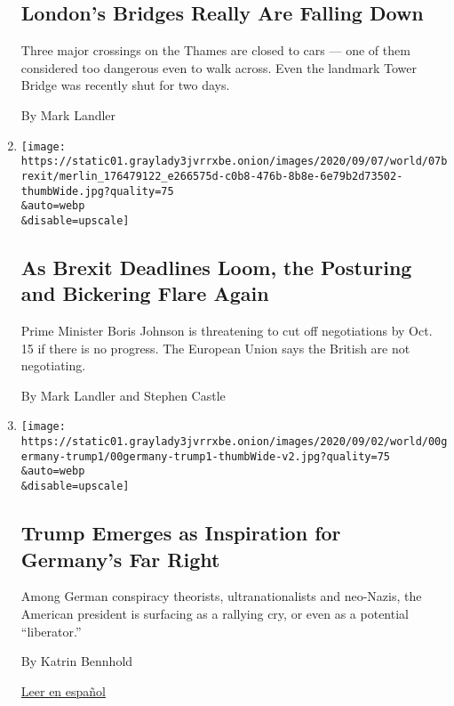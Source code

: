 \begin{enumerate}
  \hypertarget{londons-bridges-really-are-falling-down}{%
  \subsection{London's Bridges Really Are Falling
  Down}\label{londons-bridges-really-are-falling-down}}

  Three major crossings on the Thames are closed to cars --- one of them
  considered too dangerous even to walk across. Even the landmark Tower
  Bridge was recently shut for two days.

  By Mark Landler
\item
  \href{/2020/09/07/world/europe/brexit-boris-johnson.html}{}

  \texttt{[image: https://static01.graylady3jvrrxbe.onion/images/2020/09/07/world/07brexit/merlin\_176479122\_e266575d-c0b8-476b-8b8e-6e79b2d73502-thumbWide.jpg?quality=75\\\&auto=webp\\\&disable=upscale]}

  \hypertarget{as-brexit-deadlines-loom-the-posturing-and-bickering-flare-again}{%
  \subsection{As Brexit Deadlines Loom, the Posturing and Bickering
  Flare
  Again}\label{as-brexit-deadlines-loom-the-posturing-and-bickering-flare-again}}

  Prime Minister Boris Johnson is threatening to cut off negotiations by
  Oct. 15 if there is no progress. The European Union says the British
  are not negotiating.

  By Mark Landler and Stephen Castle
\item
  \href{/2020/09/07/world/europe/germany-trump-far-right.html}{}

  \texttt{[image: https://static01.graylady3jvrrxbe.onion/images/2020/09/02/world/00germany-trump1/00germany-trump1-thumbWide-v2.jpg?quality=75\\\&auto=webp\\\&disable=upscale]}

  \hypertarget{trump-emerges-as-inspiration-for-germanys-far-right}{%
  \subsection{Trump Emerges as Inspiration for Germany's Far
  Right}\label{trump-emerges-as-inspiration-for-germanys-far-right}}

  Among German conspiracy theorists, ultranationalists and neo-Nazis,
  the American president is surfacing as a rallying cry, or even as a
  potential ``liberator.''

  By Katrin Bennhold

  \href{https://www.nytimes3xbfgragh.onion/es/2020/09/08/espanol/mundo/trump-alemania-qanon.html}{Leer
  en español}
\end{enumerate}

